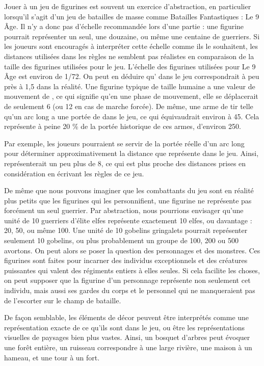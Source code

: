 Jouer à un jeu de figurines est souvent un exercice d'abstraction, en particulier lorsqu'il s'agit d'un jeu de batailles de masse comme Batailles Fantastiques : Le 9\ieme{} Âge. Il n'y a donc pas d'échelle recommandée lors d'une partie : une figurine pourrait représenter un seul, une douzaine, ou même une centaine de guerriers. Si les joueurs sont encouragés à interpréter cette échelle comme ils le souhaitent, les distances utilisées dans les règles ne semblent pas réalistes en comparaison de la taille des figurines utilisées pour le jeu. L'échelle des figurines utilisées pour Le 9\ieme{} Âge est environ de 1/72. On peut en déduire qu' dans le jeu correspondrait à peu près à 1,5 {\meter} dans la réalité. Une figurine typique de taille humaine a une valeur de mouvement de , ce qui signifie qu'en une phase de mouvement, elle se déplacerait de seulement \unit{6}{\meter} (ou \unit{12}{\meter} en cas de marche forcée). De même, une arme de tir telle qu'un arc long a une portée de  dans le jeu, ce qui équivaudrait environ à \unit{45}{\meter}. Cela représente à peine 20 \% de la portée historique de ces armes, d'environ \unit{250}{\meter}.

Par exemple, les joueurs pourraient se servir de la portée réelle d'un arc long pour déterminer approximativement la distance que représente  dans le jeu. Ainsi,  représenterait un peu plus de \unit{8}{\meter}, ce qui est plus proche des distances prises en considération en écrivant les règles de ce jeu.

De même que nous pouvons imaginer que les combattants du jeu sont en réalité plus petits que les figurines qui les personnifient, une figurine ne représente pas forcément un seul guerrier. Par abstraction, nous pourrions envisager qu'une unité de 10 guerriers d'élite elfes représente exactement 10 elfes, ou davantage : 20, 50, ou même 100. Une unité de 10 gobelins gringalets pourrait représenter seulement 10 gobelins, ou plus probablement un groupe de 100, 200 ou 500 avortons. On peut alors se poser la question des personnages et des monstres. Ces figurines sont faites pour incarner des individus exceptionnels et des créatures puissantes qui valent des régiments entiers à elles seules. Si cela facilite les choses, on peut supposer que la figurine d'un personnage représente non seulement cet individu, mais aussi ses gardes du corps et le personnel qui ne manqueraient pas de l'escorter sur le champ de bataille.

De façon semblable, les éléments de décor peuvent être interprétés comme une représentation exacte de ce qu'ils sont dans le jeu, ou être les représentations visuelles de paysages bien plus vastes. Ainsi, un bosquet d'arbres peut évoquer une forêt entière, un ruisseau correspondre à une large rivière, une maison à un hameau, et une tour à un fort.

